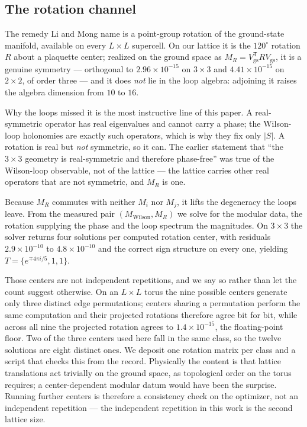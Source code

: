 \documentclass[aps,pra,twocolumn,superscriptaddress,longbibliography,floatfix,nofootinbib]{revtex4-2}
\begin{document}
\subsection{The rotation channel}
\label{sec:rotation}

The remedy Li and Mong name is a point-group rotation of the ground-state
manifold, available on every $L\times L$ supercell. On our lattice it is the
$120^{\circ}$ rotation $R$ about a plaquette center; realized on the ground
space as $M_R=V_{\mathrm{gs}}^{\mathsf T}RV_{\mathrm{gs}}$, it is a genuine
symmetry --- orthogonal to $2.96\times10^{-15}$ on $3\times3$ and
$4.41\times10^{-15}$ on $2\times2$, of order three --- and it does \emph{not}
lie in the loop algebra: adjoining it raises the algebra dimension from $10$ to
$16$.

Why the loops missed it is the most instructive line of this paper. A
real-symmetric operator has real eigenvalues and cannot carry a phase; the
Wilson-loop holonomies are exactly such operators, which is why they fix only
$|S|$. A rotation is real but \emph{not} symmetric, so it can. The earlier
statement that ``the $3\times3$ geometry is real-symmetric and therefore
phase-free'' was true of the Wilson-loop observable, not of the lattice --- the
lattice carries other real operators that are not symmetric, and $M_R$ is one.

Because $M_R$ commutes with neither $M_i$ nor $M_j$, it lifts the degeneracy
the loops leave. From the measured pair $(M_{\mathrm{Wilson}},M_R)$ we solve for
the modular data, the rotation supplying the phase and the loop spectrum the
magnitudes. On $3\times3$ the solver returns four solutions per computed
rotation center, with residuals $2.9\times10^{-10}$ to $4.8\times10^{-10}$ and
the correct sign structure on every one, yielding $T=\{e^{\mp4\pi i/5},1,1\}$.

Those centers are not independent repetitions, and we say so rather than let
the count suggest otherwise. On an $L\times L$ torus the nine possible centers
generate only three distinct edge permutations; centers sharing a permutation
perform the same computation and their projected rotations therefore agree bit
for bit, while across all nine the projected rotation agrees to
$1.4\times10^{-15}$, the floating-point floor. Two of the three centers used
here fall in the same class, so the twelve solutions are eight distinct ones.
We deposit one rotation matrix per class and a script that checks this from the
record. Physically the content is that lattice translations act trivially on
the ground space, as topological order on the torus requires; a
center-dependent modular datum would have been the surprise. Running further
centers is therefore a consistency check on the optimizer, not an independent
repetition --- the independent repetition in this work is the second lattice
size.
\end{document}
